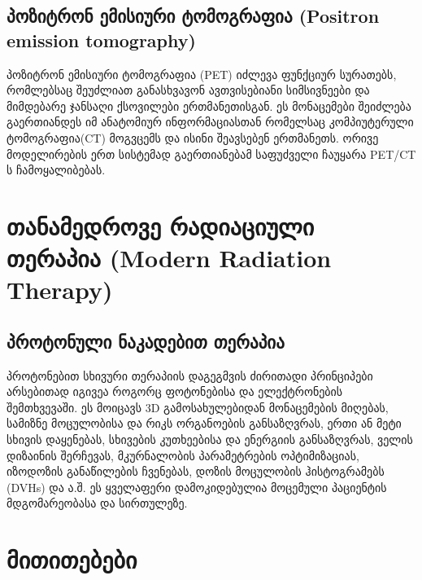 \documentclass[12pt,a4paper,]{report}
\begin{document}
\section{პოზიტრონ ემისიური ტომოგრაფია (Positron emission tomography)}
პოზიტრონ ემისიური ტომოგრაფია (PET) იძლევა ფუნქციურ სურათებს, რომლებსაც შეუძლიათ განასხვავონ ავთვისებიანი სიმსივნეები და მიმდებარე ჯანსაღი ქსოვილები ერთმანეთისგან. ეს მონაცემები შეიძლება გაერთიანდეს იმ ანატომიურ ინფორმაციასთან რომელსაც კომპიუტერული ტომოგრაფია(CT) მოგვცემს და ისინი შეავსებენ ერთმანეთს. ორივე მოდელირების ერთ სისტემად გაერთიანებამ საფუძველი ჩაუყარა PET/CT ს ჩამოყალიბებას.

\chapter{თანამედროვე რადიაციული თერაპია (Modern Radiation Therapy)}

\section{პროტონული ნაკადებით თერაპია}
პროტონებით სხივური თერაპიის დაგეგმვის ძირითადი პრინციპები არსებითად იგივეა როგორც ფოტონებისა და ელექტრონების შემთხვევაში. ეს მოიცავს 3D გამოსახულებიდან მონაცემების მიღებას, სამიზნე მოცულობისა და რიკს ორგანოების განსაზღვრას, ერთი ან მეტი სხივის დაყენებას, სხივების კუთხეებისა და ენერგიის განსაზღვრას, ველის დიზაინის შერჩევას, მკურნალობის პარამეტრების ოპტიმიზაციას, იზოდოზის განაწილების ჩვენებას, დოზის მოცულობის ჰისტოგრამებს (DVHs)  და ა.შ. ეს ყველაფერი დამოკიდებულია მოცემული პაციენტის მდგომარეობასა და სირთულეზე.
\medskip


\chapter{მითითებები}

 
\end{document}
